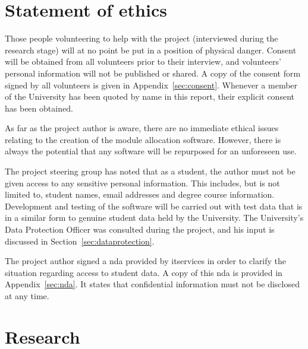 \documentclass[twoside]{scrartcl}
\let\stdsection\section
\renewcommand\section{\clearpage\stdsection}
\begin{document}
\clearpage
\tableofcontents

\clearpage
\listoffigures


\section{Statement of ethics}


Those people volunteering to help with the project (interviewed during the
research stage) will at no point be put in a position of physical danger.
Consent will be obtained from all volunteers prior to their interview, and
volunteers' personal information will not be published or shared. A copy of
the consent form signed by all volunteers is given in
Appendix~\ref{sec:consent}. Whenever a member of the University has been
quoted by name in this report, their explicit consent has been obtained.


As far as the project author is aware, there are no immediate ethical issues
relating to the creation of the module allocation software. However, there is
always the potential that any software will be repurposed for an unforeseen
use.


The project steering group has noted that as a student, the author must not be
given access to any sensitive personal information. This includes, but is not
limited to, student names, email addresses and degree course information.
Development and testing of the software will be carried out with test data
that is in a similar form to genuine student data held by the University.
The University's Data Protection Officer was consulted during the project, and
his input is discussed in Section~\ref{sec:dataprotection}.

The project author signed a \gls{nda} provided by \gls{itservices} in order to
clarify the situation regarding access to student data. A copy of this
\gls{nda} is provided in Appendix~\ref{sec:nda}. It states that confidential
information must not be disclosed at any time.










\section{Research}
\label{sec:research}
\end{document}
